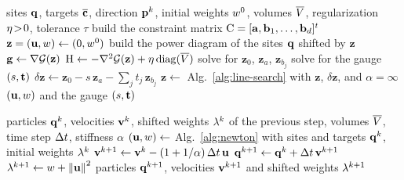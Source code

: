 \documentclass[main.tex]{subfiles}
\begin{document}
\begin{algorithm}[H]
  \caption{Bordered Newton solve of \eqref{eq:flow-line-constraint} (Appendix~\ref{sec:appendix-bordered}).}
  \label{alg:flow-constrained-newton}
  \begin{algorithmic}[1]
    \Require sites $\mathbf{q}$, targets $\overline{\mathbf{c}}$, direction $\mathbf{p}^k$, initial weights $w^0$, volumes $\overline{V}$, regularization $\eta \!>\! 0$, tolerance $\tau$
    \State build the constraint matrix $\mathrm{C} = [\mathbf{a}, \mathbf{b}_1, \dots, \mathbf{b}_d]^{t}$ \Comment{\eqref{eq:appendix-constraint-matrix}}
    \State $\mathbf{z} = (\mathbf{u}, w) \gets (0, w^0)$
    \State build the power diagram of the sites $\mathbf{q}$ shifted by $\mathbf{z}$ \Comment{\eqref{eq:shifted-site}}
    \Repeat
      \State $\mathbf{g} \gets \nabla\mathcal{G}(\mathbf{z})$ \Comment{\eqref{eq:joint-gradient}}
      \State $\mathrm{H} \gets -\nabla^2\mathcal{G}(\mathbf{z}) + \eta\,\mathrm{diag}(\overline{V})$ \Comment{\eqref{eq:appendix-bordered-matrix}}
      \State solve for $\mathbf{z}_0$, $\mathbf{z}_a$, $\mathbf{z}_{b_j}$ \Comment{\eqref{eq:flow-constrained-elimination-solve}}
      \State solve for the gauge $(s, \mathbf{t})$ \Comment{\eqref{eq:flow-constrained-elimination-gauge}}
      \State $\delta\mathbf{z} \gets \mathbf{z}_0 - s\,\mathbf{z}_a - \sum_j t_j\,\mathbf{z}_{b_j}$ \Comment{\eqref{eq:flow-constrained-elimination-update}}
      \State $\mathbf{z} \gets$ Alg.~\ref{alg:line-search} with $\mathbf{z}$, $\delta\mathbf{z}$, and $\alpha = \infty$
     \Comment{\eqref{eq:flow-constrained-newton}}
    \State \Return $(\mathbf{u}, w)$ and the gauge $(s, \mathbf{t})$
  \end{algorithmic}
\end{algorithm}

\begin{algorithm}[H]
  \caption{Time step of the penalty-based integrator (\S\ref{sec:flow-penalty}).}
  \label{alg:flow-penalty}
  \begin{algorithmic}[1]
    \Require particles $\mathbf{q}^k$, velocities $\mathbf{v}^k$, shifted weights $\lambda^k$ of the previous step, volumes $\overline{V}$, time step $\Delta t$, stiffness $\alpha$
    \State $(\mathbf{u}, w) \gets$ Alg.~\ref{alg:newton} with sites and targets $\mathbf{q}^k$, initial weights $\lambda^k$
    \State $\mathbf{v}^{k+1} \gets \mathbf{v}^k - (1 + 1/\alpha)\,\Delta t\,\mathbf{u}$ \Comment{\eqref{eq:flow-softened-step-vel}}
    \State $\mathbf{q}^{k+1} \gets \mathbf{q}^k + \Delta t\,\mathbf{v}^{k+1}$ \Comment{\eqref{eq:flow-softened-step-pos}}
    \State $\lambda^{k+1} \gets w + \left\lVert \mathbf{u} \right\rVert^2$ \Comment{\eqref{eq:shifted-site-weight}}
    \State \Return particles $\mathbf{q}^{k+1}$, velocities $\mathbf{v}^{k+1}$ and shifted weights $\lambda^{k+1}$
  \end{algorithmic}
\end{algorithm}
\end{document}
